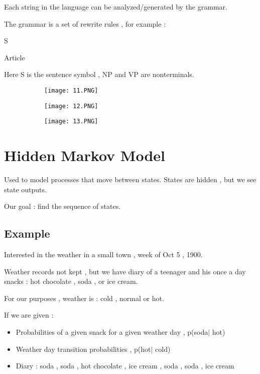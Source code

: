 \documentclass{article}
\begin{document}
Each string in the language can be analyzed/generated by the grammar.

The grammar is a set of rewrite rules , for example :

S 

Article 

Here S is the sentence symbol , NP and VP are nonterminals.

\begin{figure}[ht!]
  \centering
  \begin{subfigure}[b]{0.5\linewidth}
    \texttt{[image: 11.PNG]}
  \end{subfigure}
\end{figure}


\begin{figure}[ht!]
  \centering
  \begin{subfigure}[b]{0.5\linewidth}
    \texttt{[image: 12.PNG]}
  \end{subfigure}
     \begin{subfigure}[b]{0.49\textwidth}
         \centering
         \texttt{[image: 13.PNG]}
     \end{subfigure}
\end{figure}

\section{Hidden Markov Model}

Used to model processes that move between states. States are hidden , but we see state outputs.

Our goal : find the sequence of states.

\subsection{Example}

Interested in the weather in a small town , week of Oct 5 , 1900.

Weather records not kept , but we have diary of a teenager and his once a day snacks : hot chocolate , soda , or ice cream.

For our purposes , weather is : cold , normal or hot.

If we are given : 

\begin{itemize}
    \item Probabilities of a given snack for a given weather day , p(soda$|$ hot)
    \item Weather day transition probabilities , p(hot$|$ cold)
    \item Diary : soda , soda , hot chocolate , ice cream , soda , soda , ice cream
\end{itemize}
\end{document}
